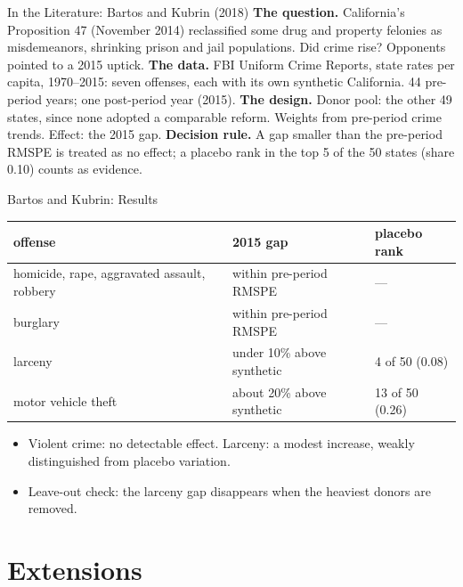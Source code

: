 \documentclass[aspectratio=169,11pt,xcolor=dvipsnames]{beamer}
\begin{document}
\begin{frame}{In the Literature: Bartos and Kubrin (2018)}
\textbf{The question.} California's Proposition 47 (November 2014) reclassified
some drug and property felonies as misdemeanors, shrinking prison and jail
populations. Did crime rise? Opponents pointed to a 2015 uptick.
\vskip3pt
\textbf{The data.} FBI Uniform Crime Reports, state rates per capita,
1970--2015: seven offenses, each with its own synthetic California. 44 pre-period
years; one post-period year (2015).
\vskip3pt
\textbf{The design.} Donor pool: the other 49 states, since none adopted a
comparable reform. Weights from pre-period crime trends. Effect: the 2015 gap.
\vskip3pt
\textbf{Decision rule.} A gap smaller than the pre-period RMSPE is treated as
no effect; a placebo rank in the top 5 of the 50 states (share 0.10) counts as evidence.
\end{frame}

\begin{frame}{Bartos and Kubrin: Results}
\begin{center}\small
\renewcommand{\arraystretch}{1.12}
\begin{tabular}{@{}lll@{}}
\toprule
offense & 2015 gap & placebo rank \\
\midrule
homicide, rape, aggravated assault, robbery & within pre-period RMSPE & --- \\
burglary & within pre-period RMSPE & --- \\
larceny & under 10\% above synthetic & 4 of 50 (0.08) \\
motor vehicle theft & about 20\% above synthetic & 13 of 50 (0.26) \\
\bottomrule
\end{tabular}
\end{center}
\vskip4pt
\begin{itemize}\itemsep3pt
  \item Violent crime: no detectable effect. Larceny: a modest increase, weakly
        distinguished from placebo variation.
  \item Leave-out check: the larceny gap disappears when the heaviest donors
        are removed.
\end{itemize}
\end{frame}

\section[Extensions]{Extensions}
\begin{frame}\sectionpage\end{frame}
\end{document}
